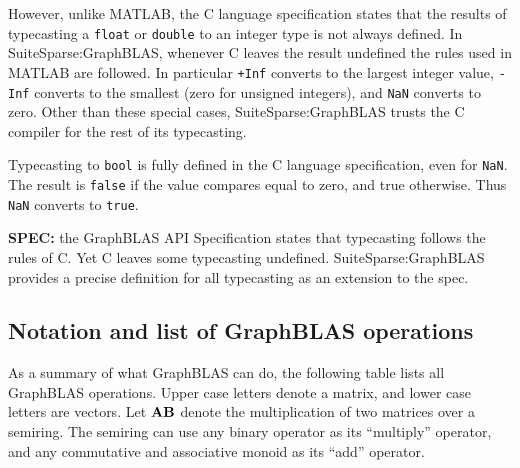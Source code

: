\documentclass[12pt]{article}
\begin{document}
However, unlike MATLAB, the C language specification states that the results of
typecasting a \verb'float' or \verb'double' to an integer type is not always
defined.  In SuiteSparse:GraphBLAS, whenever C leaves the result undefined the
rules used in MATLAB are followed.  In particular \verb'+Inf' converts to the
largest integer value, \verb'-Inf' converts to the smallest (zero for unsigned
integers), and \verb'NaN' converts to zero.  Other than these special cases,
SuiteSparse:GraphBLAS trusts the C compiler for the rest of its typecasting.

Typecasting to \verb'bool' is fully defined in the C language specification,
even for \verb'NaN'.  The result is \verb'false' if the value compares equal to
zero, and true otherwise.  Thus \verb'NaN' converts to \verb'true'.

\begin{spec}
{\bf SPEC:} the GraphBLAS API Specification states that typecasting follows the rules of C.  Yet C leaves some typecasting undefined.   SuiteSparse:GraphBLAS provides a precise definition for all typecasting as an extension to the spec.
\end{spec}

\subsection{Notation and list of GraphBLAS operations} %
\label{list}

As a summary of what GraphBLAS can do, the following table lists all GraphBLAS
operations.  Upper case letters denote a matrix, and lower case letters are
vectors.  Let ${\bf AB}$  denote the multiplication of two matrices over a
semiring.  The semiring can use any binary operator as its ``multiply''
operator, and any commutative and associative monoid as its ``add'' operator.
\end{document}

